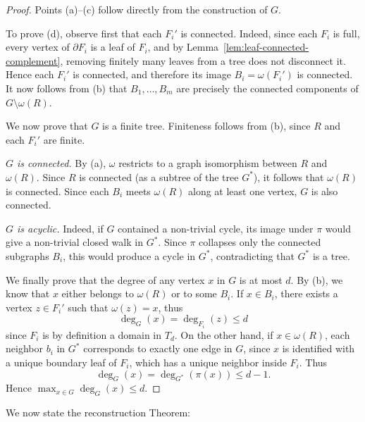 \documentclass[a4paper, 11pt]{article}
\numberwithin{equation}{section}
\theoremstyle{definition}
\theoremstyle{remark}
\begin{document}
 

\begin{proof}
Points (a)--(c) follow directly from the construction of $G$.

\smallskip

To prove (d),  observe first that each $F_i'$ is connected. Indeed, since each
$F_i$ is full, every vertex of $\partial F_i$ is a leaf of $F_i$, and by
Lemma~\ref{lem:leaf-connected-complement}, removing finitely many leaves  from a tree does not disconnect it. Hence each $F_i'$ is connected, and therefore
its image $B_i=\omega(F_i')$ is connected. 
It now follows from (b) that  $B_1,\dots,B_m$ are precisely the connected components of $G\setminus \omega(R)$.
 
\medskip


We now prove that $G$ is a finite tree.  Finiteness follows from (b), since $R$ and each $F_i'$ are finite.

\medskip

\emph{$G$ is connected.}
By (a), $\omega$ restricts to a graph isomorphism between $R$ and $\omega(R)$.
 Since $R$ is connected (as a subtree of the tree $G^*$), it follows that $\omega(R)$ is connected.
Since each $B_i$ meets $\omega(R)$  along at least one vertex, $G$ is also connected.

\medskip

\emph{$G$ is acyclic.} Indeed, if  $G$ contained a non-trivial cycle, its image under $\pi$ would give a non-trivial closed walk in $G^*$. Since $\pi$ collapses only the connected subgraphs $B_i$,
this would produce a cycle in $G^*$, contradicting that $G^*$ is a tree. 


\medskip

We finally prove that the  degree of any vertex $x$ in $G$ is at most $d$. By (b), we know that $x$ either belongs to $\omega(R)$ or to some $B_i$. If $x\in B_i$, there exists a vertex $z\in F_i'$ such that $\omega(z) =x$, thus
$$
 \deg_{G}(x)  =  \deg_{F_i}(z) \leq d  
$$
since $F_i$ is by definition a domain in $T_d$. 
On the other hand, if  $x\in \omega(R)$, each neighbor $b_i$ in $G^*$ corresponds to exactly one edge in $G$, since $x$ is identified with a unique boundary leaf of $F_i$, which has a unique neighbor inside $F_i$.
Thus
\[
\deg_G(x)=\deg_{G^*}(\pi(x))\le d-1.
\]
Hence $\max_{x\in G}\deg_G(x)\le d$.

\end{proof}

 \medskip

We  now state the reconstruction Theorem: 
\end{document}
